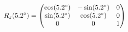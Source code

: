 \documentclass[preview]{standalone}
\begin{document}
\begin{align*}
\special{dvisvgm:raw <g id='unique000'>}R_z(5.2^\circ) = \begin{pmatrix} \cos(5.2^\circ) & -\sin(5.2^\circ) & 0 \\ \sin(5.2^\circ) & \cos(5.2^\circ) & 0 \\ 0 & 0 & 1 \end{pmatrix}\special{dvisvgm:raw </g>}
\end{align*}
\end{document}
